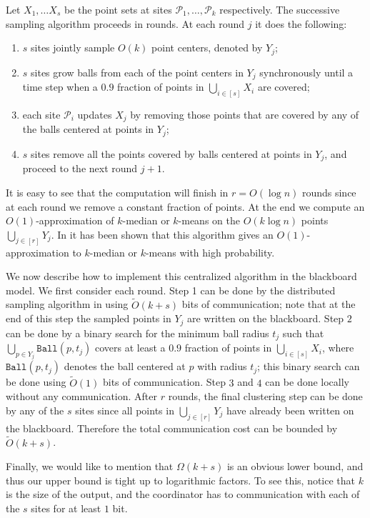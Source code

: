Let $X_1, \ldots X_s$ be the point sets at sites $\mathcal{P}_1, \ldots, \mathcal{P}_k$ respectively. The successive sampling algorithm proceeds in rounds. At each round $j$ it does the following:
\begin{enumerate}
\item $s$ sites jointly sample $O(k)$ point centers, denoted by $Y_j$;

\item $s$ sites grow balls from each of the point centers in $Y_j$ synchronously until a time step when a $0.9$ fraction of points in $\bigcup_{i \in [s]} X_i$ are covered;

\item each site $\mathcal{P}_i$ updates $X_j$ by removing those points that are covered by any of the balls centered at points in $Y_j$;

\item $s$ sites remove all the points covered by balls centered at points in $Y_j$, and proceed to the next round $j+1$.
\end{enumerate}
It is easy to see that the computation will finish in $r = O(\log n)$ rounds since at each round we remove a constant fraction of points.  At the end we compute an $O(1)$-approximation of $k$-median or $k$-means on the $O(k \log n)$ points $\bigcup_{j \in [r]} Y_j$.  In \cite{MP04} it has been shown that this algorithm gives an $O(1)$-approximation to $k$-median or $k$-means with high probability.

We now describe how to implement this centralized algorithm in the blackboard model.  We first consider each round.  Step 1 can be done by the distributed sampling algorithm in \cite{CMYZ12} using $\tilde{O}(k+s)$ bits of communication; note that at the end of this step the sampled points in $Y_j$ are written on the blackboard.
Step $2$ can be done by a binary search for the minimum ball radius $t_j$ such that $\bigcup_{p \in Y_j} \mathtt{Ball}(p, t_j)$ covers at least a $0.9$ fraction of points in  $\bigcup_{i \in [s]} X_i$, where $\mathtt{Ball}(p, t_j)$ denotes the ball centered at $p$ with radius $t_j$;  this binary search can be done using $\tilde{O}(1)$ bits of communication.  Step $3$ and $4$ can be done locally without any communication.   After $r$ rounds, the final clustering step can be done by any of the $s$ sites since all points in $\bigcup_{j \in [r]} Y_j$ have already been written on the blackboard.
Therefore the total communication cost can be bounded by $\tilde{O}(k+s)$.

Finally, we would like to mention that $\Omega(k + s)$ is an obvious lower bound, and thus our upper bound is tight up to logarithmic factors.  To see this, notice that $k$ is the size of the output, and the coordinator has to communication with each of the $s$ sites for at least $1$ bit.









